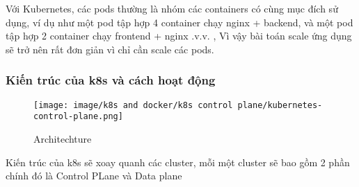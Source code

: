 \documentclass[a4paper,12pt]{article}
\begin{document}
\begin{enumerate}
Với Kubernetes, các pods thường là nhóm các containers có cùng mục đích sử dụng, ví dụ như một pod tập hợp 4 container chạy nginx + backend, và một pod tập hợp 2 container chạy frontend + nginx .v.v. , Vì vậy bài toán scale ứng dụng sẽ trở nên rất đơn giản vì chỉ cần scale các pods.


    
\end{enumerate}

\subsubsection{ Kiến trúc của k8s và cách hoạt động}


\begin{figure}[htbp]
    \centering
    \texttt{[image: image/k8s and docker/k8s control plane/kubernetes-control-plane.png]}
    \caption{Architechture}
    \label{}
\end{figure}




Kiến trúc của k8s sẽ xoay quanh các cluster, mỗi một cluster sẽ bao gồm 2 phần chính đó là Control PLane và Data plane 
\end{document}
